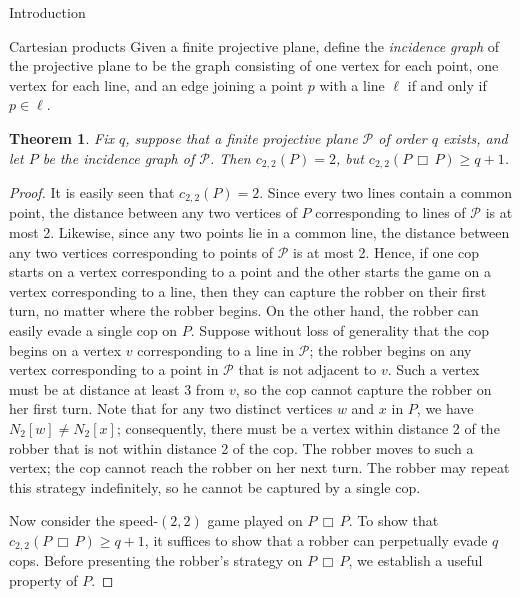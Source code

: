 \documentclass[12pt]{amsart}
\newtheorem{theorem}[lemma]{Theorem}
\theoremstyle{definition}
\def\cart{\, \Box \,}
\newcommand{\speed}[1]{c_{#1,#1}}
\begin{document}
\begin{section}{Introduction}
\begin{section}{Cartesian products}
Given a finite projective plane, define the \textit{incidence graph} of the projective plane to be the graph consisting of one vertex for each point, one vertex for each line, and an edge joining a point $p$ with a line $\ell$ if and only if $p \in \ell$.

\begin{theorem}\label{thm:projective_plane_product}
Fix $q$, suppose that a finite projective plane $\mathcal{P}$ of order $q$ exists, and let $P$ be the incidence graph of $\mathcal{P}$.  Then $\speed{2}(P) = 2$, but $\speed{2}(P \cart P) \ge q+1$.
\end{theorem}
\begin{proof}
It is easily seen that $\speed{2}(P) = 2$.  Since every two lines contain a common point, the distance between any two vertices of $P$ corresponding to lines of $\mathcal{P}$ is at most 2.  Likewise, since any two points lie in a common line, the distance between any two vertices corresponding to points of $\mathcal{P}$ is at most 2.  Hence, if one cop starts on a vertex corresponding to a point and the other starts the game on a vertex corresponding to a line, then they can capture the robber on their first turn, no matter where the robber begins.  On the other hand, the robber can easily evade a single cop on $P$.  Suppose without loss of generality that the cop begins on a vertex $v$ corresponding to a line in $\mathcal{P}$; the robber begins on any vertex corresponding to a point in $\mathcal{P}$ that is not adjacent to $v$.  Such a vertex must be at distance at least 3 from $v$, so the cop cannot capture the robber on her first turn.  Note that for any two distinct vertices $w$ and $x$ in $P$, we have $N_2[w] \not = N_2[x]$; consequently, there must be a vertex within distance 2 of the robber that is not within distance 2 of the cop.  The robber moves to such a vertex; the cop cannot reach the robber on her next turn.  The robber may repeat this strategy indefinitely, so he cannot be captured by a single cop.

Now consider the speed-$(2,2)$ game played on $P \cart P$.  To show that $\speed{2}(P \cart P) \ge q+1$, it suffices to show that a robber can perpetually evade $q$ cops.  Before presenting the robber's strategy on $P\cart P$, we establish a useful property of $P$.  


\end{proof}
\end{section}
\end{section}
\end{document}
